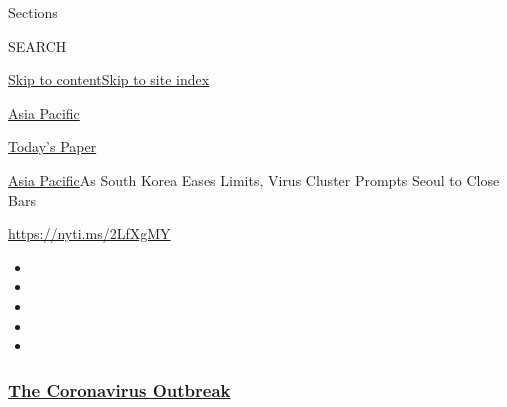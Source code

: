 Sections

SEARCH

\protect\hyperlink{site-content}{Skip to
content}\protect\hyperlink{site-index}{Skip to site index}

\href{https://www.nytimes3xbfgragh.onion/section/world/asia}{Asia
Pacific}

\href{https://myaccount.nytimes3xbfgragh.onion/auth/login?response_type=cookie\&client_id=vi}{}

\href{https://www.nytimes3xbfgragh.onion/section/todayspaper}{Today's
Paper}

\href{/section/world/asia}{Asia Pacific}\textbar{}As South Korea Eases
Limits, Virus Cluster Prompts Seoul to Close Bars

\url{https://nyti.ms/2LfXgMY}

\begin{itemize}
\item
\item
\item
\item
\item
\end{itemize}

\hypertarget{the-coronavirus-outbreak}{%
\subsubsection{\texorpdfstring{\href{https://www.nytimes3xbfgragh.onion/news-event/coronavirus?name=styln-coronavirus-national\&region=TOP_BANNER\&variant=undefined\&block=storyline_menu_recirc\&action=click\&pgtype=Article\&impression_id=5c719a90-e396-11ea-8c52-fd2265771867}{The
Coronavirus
Outbreak}}{The Coronavirus Outbreak}}\label{the-coronavirus-outbreak}}

